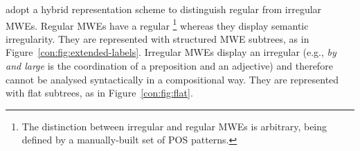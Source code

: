 \documentclass[output=paper]{langsci/langscibook}
\begin{document}
\citet{candito2014strategies} adopt a hybrid representation scheme to distinguish regular from irregular MWEs. Regular MWEs have a regular \footnote{The distinction between irregular and regular MWEs is arbitrary, being defined by a manually-built set of POS patterns.} whereas they display semantic irregularity. They are represented with structured MWE subtrees, as in Figure~\ref{con:fig:extended-labels}. Irregular MWEs display an irregular  (e.g., \textit{by and large} is the coordination of a preposition and an adjective) and therefore cannot be analysed syntactically in a compositional way. They are represented with flat subtrees, as in Figure~\ref{con:fig:flat}.










\end{document}
